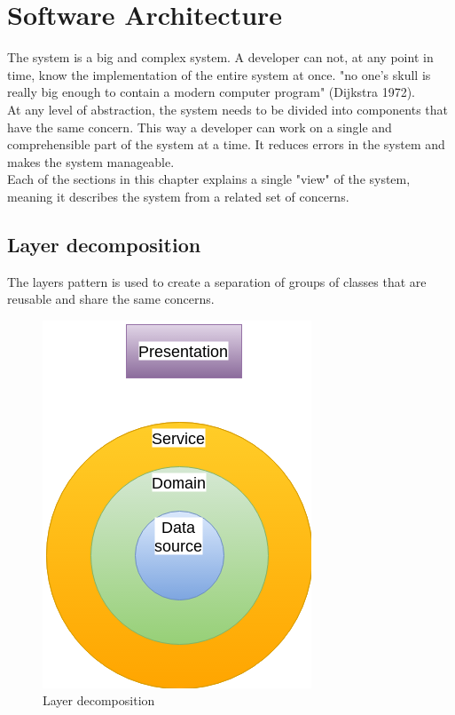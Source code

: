 \chapter{Software Architecture}
\label{ch:software}

The \ShortName system is a big and complex system. A developer can not, at any point in time, know the implementation of the entire system at once. "no one's skull is really big enough to contain a modern computer program" (Dijkstra 1972).\\
At any level of abstraction, the system needs to be divided into components that have the same concern. This way a developer can work on a single and comprehensible part of the system at a time. It reduces errors in the system and makes the system manageable.\\
Each of the sections in this chapter explains a single "view" of the system, meaning it describes the system from a related set of concerns.

\section{Layer decomposition}
The layers pattern is used to create a separation of groups of classes that are reusable and share the same concerns.

\begin{figure}[H]
\centering
\includegraphics[scale=0.7]{7-software/images/LayersCircle.png}
\caption{Layer decomposition}
\label{fig:layerscircle}
\end{figure}

